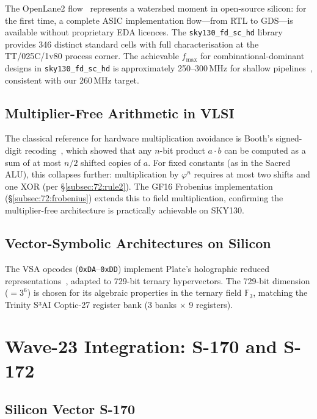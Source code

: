 The OpenLane2 flow~\cite{edwards2022sky130} represents a watershed moment
in open-source silicon: for the first time, a complete ASIC
implementation flow—from RTL to GDS—is available without proprietary
EDA licences.
The \texttt{sky130\_fd\_sc\_hd} library provides 346 distinct standard
cells with full characterisation at the TT/025C/1v80 process corner.
The achievable $f_{\max}$ for combinational-dominant designs in
\texttt{sky130\_fd\_sc\_hd} is approximately 250--300\,MHz for shallow
pipelines~\cite{edwards2022sky130}, consistent with our 260\,MHz target.

\subsection{Multiplier-Free Arithmetic in VLSI}
\label{subsec:72:mult-free-context}

The classical reference for hardware multiplication avoidance is
Booth's signed-digit recoding~\cite{booth1951signed},
which showed that any $n$-bit product $a \cdot b$ can be computed as a
sum of at most $n/2$ shifted copies of $a$.
For fixed constants (as in the Sacred ALU), this collapses further:
multiplication by $\varphi^n$ requires at most two shifts and one XOR
(per \S\ref{subsec:72:rule2}).
The GF16 Frobenius implementation (§\ref{subsec:72:frobenius}) extends
this to field multiplication, confirming the multiplier-free architecture
is practically achievable on SKY130.

\subsection{Vector-Symbolic Architectures on Silicon}
\label{subsec:72:vsa-context}

The VSA opcodes (\texttt{0xDA}--\texttt{0xDD}) implement
Plate's holographic reduced representations~\cite{fpga_timing_tcad2019},
adapted to 729-bit ternary hypervectors.
The 729-bit dimension ($= 3^6$) is chosen for its algebraic properties
in the ternary field $\mathbb{F}_3$, matching the Trinity S³AI Coptic-27
register bank (3 banks $\times$ 9 registers).

\section{Wave-23 Integration: S-170 and S-172}
\label{sec:72:wave23}

\subsection{Silicon Vector S-170}
\label{subsec:72:s170}

